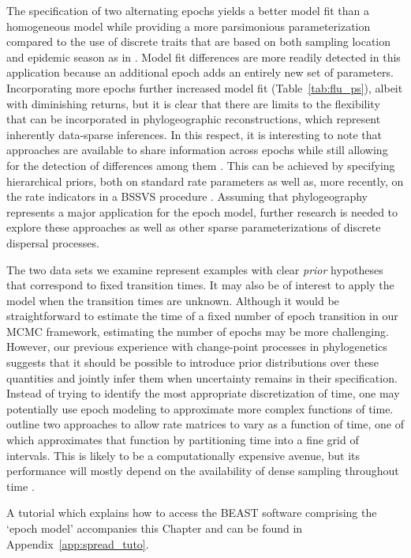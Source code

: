 The specification of two alternating epochs yields a better model fit than a homogeneous model while providing a more parsimonious parameterization compared to the use of discrete traits that are based on both sampling location and epidemic season as in \citet{Bahl2011}.
Model fit differences are more readily detected in this application because an additional epoch adds an entirely new set of parameters.
Incorporating more epochs further increased model fit (Table~\ref{tab:flu_ps}), albeit with diminishing returns, but it is clear that there are limits to the flexibility that can be incorporated in phylogeographic reconstructions, which represent inherently data-sparse inferences.
In this respect, it is interesting to note that approaches are available to share information across epochs while still allowing for the detection of differences among them \citep{Suchard2003b}.
This can be achieved by specifying hierarchical priors, both on standard rate parameters \citep{Edo-Matas2011} as well as, more recently, on the rate indicators in a BSSVS procedure \citep{Cybis2013}.
Assuming that phylogeography represents a major application for the epoch model, further research is needed to explore these approaches as well as other sparse parameterizations of discrete dispersal processes.

The two data sets we examine represent examples with clear \textit{prior} hypotheses that correspond to fixed transition times.
It may also be of interest to apply the model when the transition times are unknown. 
Although it would be straightforward to estimate the time of a fixed number of epoch transition in our MCMC framework, estimating the number of epochs may be more challenging.
However, our previous experience with change-point processes in phylogenetics \citep{Suchard2003a} suggests that it should be possible to introduce prior distributions over these quantities and jointly infer them when uncertainty remains in their specification.
Instead of trying to identify the most appropriate discretization of time, one may potentially use epoch modeling to approximate more complex functions of time.
\citet{Rodrigo2008} outline two approaches to allow rate matrices to vary as a function of time, one of which approximates that function by partitioning time into a fine grid of intervals.
This is likely to be a computationally expensive avenue, but its performance will mostly depend on the availability of dense sampling throughout time \citep{Rodrigo2008}.%

A tutorial which explains how to access the BEAST software comprising the `epoch model' accompanies this Chapter and can be found in Appendix~\ref{app:spread_tuto}.

